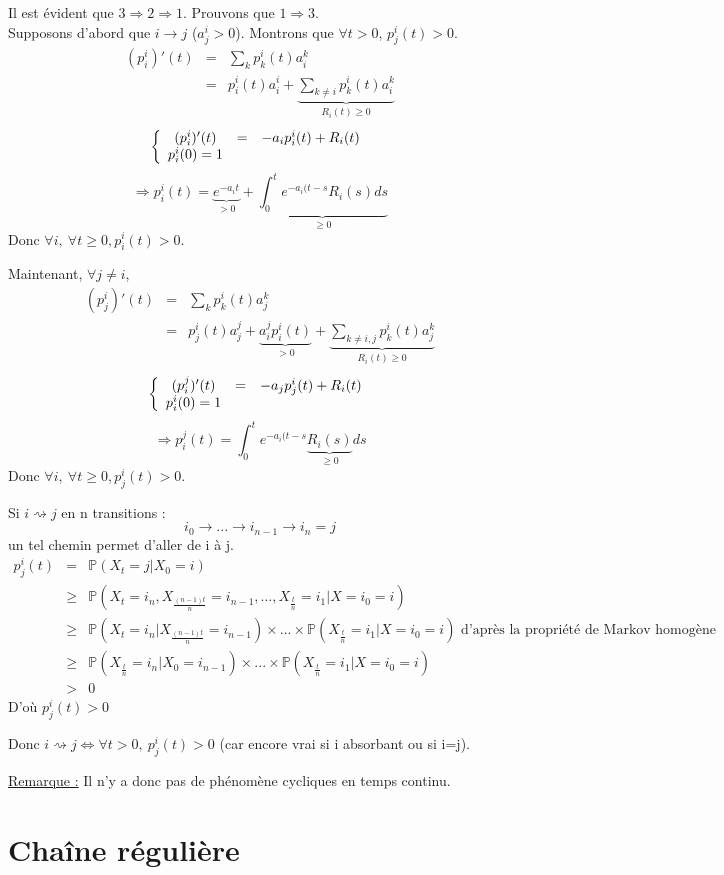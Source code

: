 \begin{dem}
Il est évident que $3\Rightarrow 2\Rightarrow 1$. Prouvons que $1\Rightarrow 3$.\\
Supposons d'abord que $i\to j$ ($a_j^i>0$). Montrons que $\forall t>0$, $p_j^i(t)>0$.
\begin{eqnarray*}
	(p_i^i)'(t)&=&\sum_k p_k^i(t)a_i^k\\
		&=& p_i^i(t)a_i^i + \underbrace{\sum_{k\neq i} p_k^i(t)a_i^k}_{R_i(t)\geq 0}
\end{eqnarray*}
\[\left\{\begin{array}{c c c}
(p_i^i)'(t)&=&-a_ip_i^i(t)+R_i(t)\\
p_i^i(0)=1
\end{array}\right.\]
\[\Rightarrow p^i_i(t)=\underbrace{e^{-a_i t}}_{>0} + \underbrace{\int_0^t e^{-a_i(t-s}R_i(s) ds}_{\geq 0}\]
Donc $\forall i,\ \forall t\geq 0, p_i^i(t)>0$. 

\bigskip
Maintenant, $\forall j\neq i$,
\begin{eqnarray*}
	(p_j^i)'(t)&=&\sum_k p_k^i(t)a_j^k\\
		&=& p_j^i(t)a_j^j +\underbrace{a_i^j p_i^i(t)}_{>0} + \underbrace{\sum_{k\neq i,j} p_k^i(t)a_j^k}_{R_i(t)\geq 0}
\end{eqnarray*}
\[\left\{\begin{array}{c c c}
(p_i^j)'(t)&=&-a_jp_j^i(t)+R_i(t)\\
p_i^i(0)=1
\end{array}\right.\]
\[\Rightarrow p^j_i(t)=\int_0^t e^{-a_i(t-s}\underbrace{R_i(s)}_{\geq 0} ds\]
Donc $\forall i,\ \forall t\geq 0, p_j^i(t)>0$. 

\bigskip
Si $i\rightsquigarrow j$ en n transitions :
	\[i_0\to ... \to i_{n-1}\to i_n=j\]
un tel chemin permet d'aller de i à j.
\begin{eqnarray*}
p_j^i(t)&=&\mathbb{P}(X_t=j|X_0=i)\\
	&\geq&\mathbb{P}(X_t=i_n,X_{\frac{(n-1)t}{n}}=i_{n-1},...,X_{\frac{t}{n}}=i_1|X=i_0=i)\\
	&\geq&\mathbb{P}(X_t=i_n|X_{\frac{(n-1)t}{n}}=i_{n-1})\times...\times\mathbb{P}(X_{\frac{t}{n}}=i_1|X=i_0=i) \text{ d'après la propriété de Markov homogène}\\
	&\geq&\mathbb{P}(X_\frac{t}{n}=i_n|X_0=i_{n-1})\times...\times\mathbb{P}(X_{\frac{t}{n}}=i_1|X=i_0=i)\\
	&>& 0
\end{eqnarray*}
D'où $p_j^i(t)>0$
\end{dem}
Donc $i\rightsquigarrow j\Leftrightarrow \forall t>0,\ p_j^i(t)>0$ (car encore vrai si i absorbant ou si i=j).

\underline{Remarque :} Il n'y a donc pas de phénomène cycliques en temps continu.

\section{Chaîne régulière}

